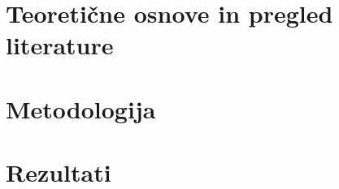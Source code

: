 \chapter{Teoretične osnove in pregled literature} \label{osnove}


\chapter{Metodologija} \label{metodologija}



\chapter{Rezultati} \label{rezultati}



